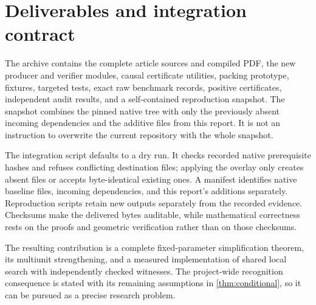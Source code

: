 \section{Deliverables and integration contract}\label{sec:deliverables}

The archive contains the complete article sources and compiled PDF, the
new producer and verifier modules, causal certificate utilities, packing
prototype, fixtures, targeted tests, exact raw benchmark records, positive
certificates, independent audit results, and a self-contained reproduction
snapshot. The snapshot combines the pinned native tree with only the
previously absent incoming dependencies and the additive files from this
report. It is not an instruction to overwrite the current repository with
the whole snapshot.

The integration script defaults to a dry run. It checks recorded native
prerequisite hashes and refuses conflicting destination files; applying
the overlay only creates absent files or accepts byte-identical existing
ones. A manifest identifies native baseline files, incoming dependencies,
and this report's additions separately. Reproduction scripts retain new
outputs separately from the recorded evidence. Checksums make the delivered
bytes auditable, while mathematical correctness rests on the proofs and
geometric verification rather than on those checksums.

The resulting contribution is a complete fixed-parameter simplification
theorem, its multiunit strengthening, and a measured implementation of
shared local search with independently checked witnesses. The project-wide
recognition consequence is stated with its remaining assumptions in
\cref{thm:conditional}, so it can be pursued as a precise research problem.
